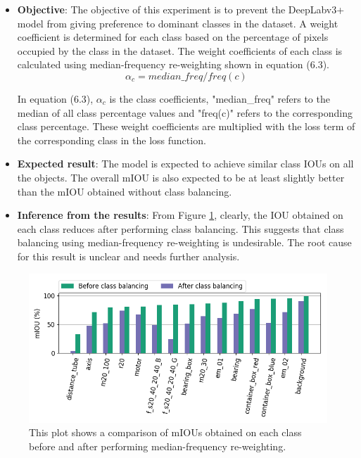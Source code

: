 	\begin{itemize}
		\item \textbf{Objective}: The objective of this experiment is to prevent the DeepLabv3+ model from giving preference to dominant classes in the dataset. A weight coefficient is determined for each class based on the percentage of pixels occupied by the class in the dataset. The weight coefficients of each class is calculated using median-frequency re-weighting \cite{cls_bal} shown in equation (6.3).
		\begin{equation}
			\alpha_c = median\_freq/freq(c)
		\end{equation}
	
		 In equation (6.3), $\alpha_c$ is the class coefficients, "median\_freq" refers to the median of all class percentage values and "freq(c)" refers to the corresponding class percentage. These weight coefficients are multiplied with the loss term of the corresponding class in the loss function.
		\item \textbf{Expected result}: The model is expected to achieve similar class IOUs on all the objects. The overall mIOU is also expected to be at least slightly better than the mIOU obtained without class balancing.
		\item \textbf{Inference from the results}: From Figure \ref{Fig:clsbal}, clearly, the IOU obtained on each class reduces after performing class balancing. This suggests that class balancing using median-frequency re-weighting is undesirable. The root cause for this result is unclear and needs further analysis.
	\end{itemize}
	
	\begin{figure}
		\centering
		\includegraphics[width=1\linewidth]{images/cls_bal_comp}
		\caption{This plot shows a comparison of mIOUs obtained on each class before and after performing median-frequency re-weighting.}
		\label{Fig:clsbal}
	\end{figure}


